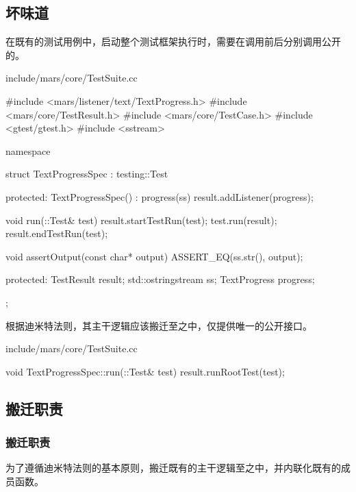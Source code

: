\begin{content}

\subsection{坏味道}

在既有的测试用例中，启动整个测试框架执行时，需要在调用前后分别调用公开的。

\begin{nodiff}{include/mars/core/TestSuite.cc}
 \begin{c++}
#include <mars/listener/text/TextProgress.h>
#include <mars/core/TestResult.h>
#include <mars/core/TestCase.h>
#include <gtest/gtest.h>
#include <sstream>

namespace {
  struct TextProgressSpec : testing::Test {
  protected:
    TextProgressSpec() : progress(ss) {
      result.addListener(progress);
    }

    void run(::Test& test) {
      result.startTestRun(test);
      test.run(result);
      result.endTestRun(test);
    }

    void assertOutput(const char* output) {
      ASSERT_EQ(ss.str(), output);
    }

  protected:
    TestResult result;
    std::ostringstream ss;
    TextProgress progress;
  };
}
 \end{c++}
\end{nodiff}

根据迪米特法则，其主干逻辑应该搬迁至之中，仅提供唯一的公开接口。

\begin{nodiff}{include/mars/core/TestSuite.cc}
 \begin{c++}
void TextProgressSpec::run(::Test& test) {
  result.runRootTest(test);   
}
 \end{c++}
\end{nodiff}

\subsection{搬迁职责}

\subsubsection{搬迁职责}

为了遵循迪米特法则的基本原则，搬迁既有的主干逻辑至之中，并内联化既有的成员函数。


\end{content}
